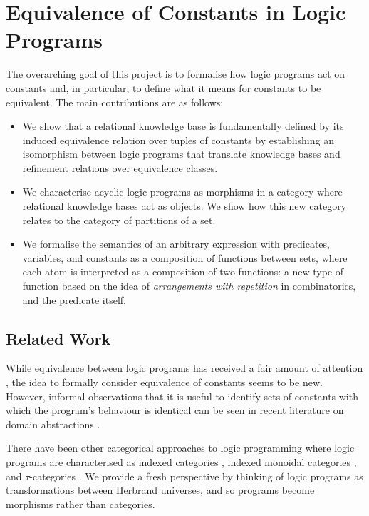 \documentclass{article}
\begin{document}
\section{Equivalence of Constants in Logic Programs}

The overarching goal of this project is to formalise how logic programs act on
constants and, in particular, to define what it means for constants to be
equivalent. The main contributions are as follows:
\begin{itemize}
\item We show that a relational knowledge base is fundamentally defined by its
  induced equivalence relation over tuples of constants by establishing an
  isomorphism between logic programs that translate knowledge bases and
  refinement relations over equivalence classes.
\item We characterise acyclic logic programs as morphisms in a category where
  relational knowledge bases act as objects. We show how this new category
  relates to the category of partitions of a set.
\item We formalise the semantics of an arbitrary expression with predicates,
  variables, and constants as a composition of functions between sets, where
  each atom is interpreted as a composition of two functions: a new type of
  function based on the idea of \emph{arrangements with repetition} in
  combinatorics, and the predicate itself.
\end{itemize}

\subsection{Related Work}

While equivalence between logic programs has received a fair amount of attention
\cite{DBLP:journals/tocl/LifschitzPV01,DBLP:conf/ecai/OikarinenJ06,DBLP:conf/iclp/EiterF03},
the idea to formally consider equivalence of constants seems to be new. However,
informal observations that it is useful to identify sets of constants with which
the program's behaviour is identical can be seen in recent literature on domain
abstractions \cite{DBLP:conf/uai/HoltzenMB17}.

There have been other categorical approaches to logic programming where logic
programs are characterised as indexed categories
\cite{DBLP:conf/elp/KinoshitaP96}, indexed monoidal categories
\cite{corradini1992categorical}, and $\tau$-categories
\cite{DBLP:conf/csl/FinkelsteinFL94}. We provide a fresh perspective by thinking
of logic programs as transformations between Herbrand universes, and so programs
become morphisms rather than categories.
\end{document}
